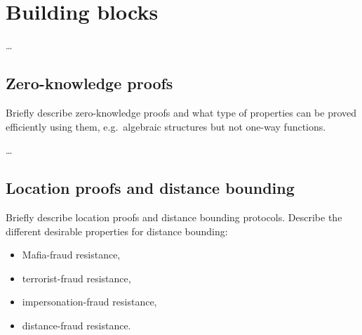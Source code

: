 \section{Building blocks}%
\label{Primitives}\label{BuildingBlocks}

\dots

\subsection{Zero-knowledge proofs}

Briefly describe zero-knowledge proofs and what type of properties can be proved 
efficiently using them, e.g.\ algebraic structures but not one-way functions.

\dots

\subsection{Location proofs and distance bounding}

Briefly describe location proofs and distance bounding protocols.
Describe the different desirable properties for distance bounding:
\begin{itemize}
  \item Mafia-fraud resistance,
  \item terrorist-fraud resistance,
  \item impersonation-fraud resistance,
  \item distance-fraud resistance.
\end{itemize}

